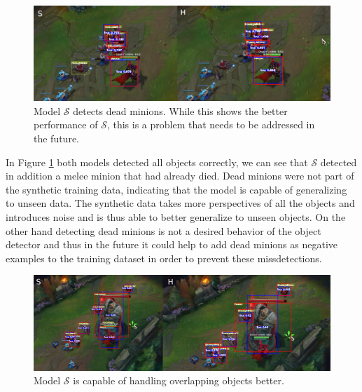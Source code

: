 \begin{figure}
\centering
\includegraphics[width=\textwidth]{figures/new_wrong.jpg}
\caption{Model $\mathcal{S}$ detects dead minions. While this shows the better performance of $\mathcal{S}$, this is a problem that needs to be addressed in the future.}
\label{fig:new_wrong}
\end{figure}

In Figure \ref{fig:new_wrong} both models detected all objects correctly, we can see that $\mathcal{S}$ detected in addition a melee minion that had already died.
Dead minions were not part of the synthetic training data, indicating that the model is capable of generalizing to unseen data.
The synthetic data takes more perspectives of all the objects and introduces noise and is thus able to better generalize to unseen objects.
On the other hand detecting dead minions is not a desired behavior of the object detector and thus in the future it could help to add dead minions as negative examples to the training dataset in order to prevent these missdetections.
\begin{figure}
\centering
\includegraphics[width=\textwidth]{figures/new_better.jpg}
\caption{Model $\mathcal{S}$ is capable of handling overlapping objects better.}
\label{fig:new_better}
\end{figure}

